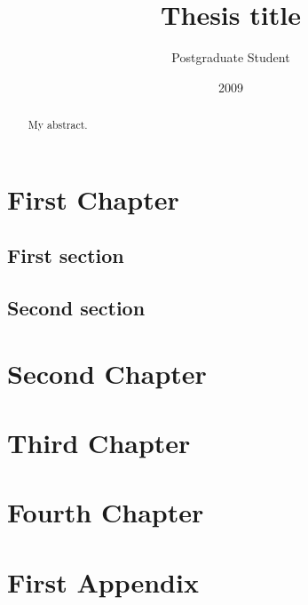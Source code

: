 \documentclass[10pt,twoside,openright]{report}
\title{Thesis title}
\author{Postgraduate Student}
\date{2009}
\begin{document}
\maketitle

\declaration

\dedication{To my ...}

\begin{abstract}
My abstract.
\end{abstract}

\tableofcontents

\chapter{First Chapter}

\section{First section}

\section{Second section}

\chapter{Second Chapter}

\chapter{Third Chapter}

\chapter{Fourth Chapter}

\appendix

\chapter{First Appendix}
\end{document}
